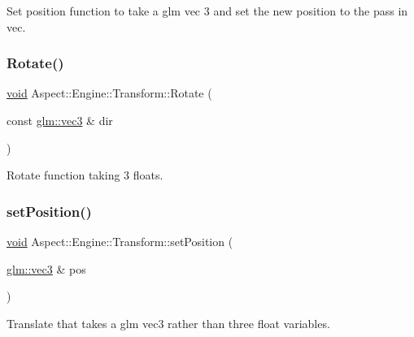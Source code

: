 Set position function to take a glm vec 3 and set the new position to the pass in vec. 

\mbox{\label{class_aspect_1_1_engine_1_1_transform_a002e393cc28fde31c5899e566876c762}} 
\subsubsection{\texorpdfstring{Rotate()}{Rotate()}\hspace{0.1cm}{\footnotesize\ttfamily [2/2]}}
{\footnotesize\ttfamily \mbox{\hyperlink{_s_d_l__opengles2__gl2ext_8h_ae5d8fa23ad07c48bb609509eae494c95}{void}} Aspect\+::\+Engine\+::\+Transform\+::\+Rotate (\begin{DoxyParamCaption}\item[{const \mbox{\hyperlink{group__core__types_ga1c47e8b3386109bc992b6c48e91b0be7}{glm\+::vec3}} \&}]{dir }\end{DoxyParamCaption})}



Rotate function taking 3 floats. 

\mbox{\label{class_aspect_1_1_engine_1_1_transform_ab5208de8f6b510f894d1fc3665a76eb8}} 
\subsubsection{\texorpdfstring{set\+Position()}{setPosition()}}
{\footnotesize\ttfamily \mbox{\hyperlink{_s_d_l__opengles2__gl2ext_8h_ae5d8fa23ad07c48bb609509eae494c95}{void}} Aspect\+::\+Engine\+::\+Transform\+::set\+Position (\begin{DoxyParamCaption}\item[{\mbox{\hyperlink{group__core__types_ga1c47e8b3386109bc992b6c48e91b0be7}{glm\+::vec3}} \&}]{pos }\end{DoxyParamCaption})}



Translate that takes a glm vec3 rather than three float variables. 

